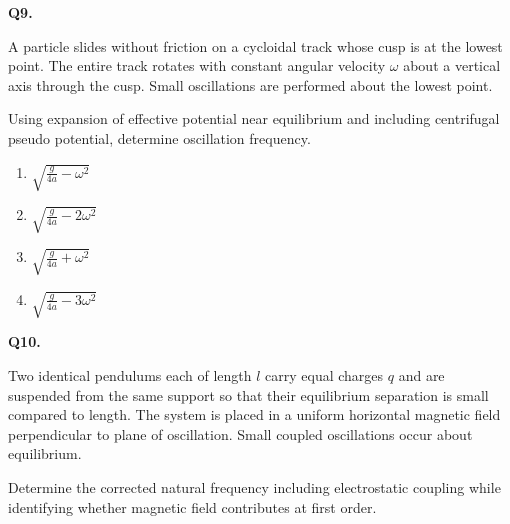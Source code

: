 \documentclass[12pt]{article}
\begin{document}

\textbf{Q9.}

A particle slides without friction on a cycloidal track whose cusp is at the lowest point. The entire track rotates with constant angular velocity $\omega$ about a vertical axis through the cusp. Small oscillations are performed about the lowest point.

Using expansion of effective potential near equilibrium and including centrifugal pseudo potential, determine oscillation frequency.

\begin{center}
\end{center}

\begin{enumerate}
\item[(A)] $\sqrt{\frac{g}{4a}-\omega^2}$
\item[(B)] $\sqrt{\frac{g}{4a}-2\omega^2}$
\item[(C)] $\sqrt{\frac{g}{4a}+\omega^2}$
\item[(D)] $\sqrt{\frac{g}{4a}-3\omega^2}$
\end{enumerate}


\textbf{Q10.}

Two identical pendulums each of length $l$ carry equal charges $q$ and are suspended from the same support so that their equilibrium separation is small compared to length. The system is placed in a uniform horizontal magnetic field perpendicular to plane of oscillation. Small coupled oscillations occur about equilibrium.

Determine the corrected natural frequency including electrostatic coupling while identifying whether magnetic field contributes at first order.

\begin{center}
\end{center}
\end{document}

